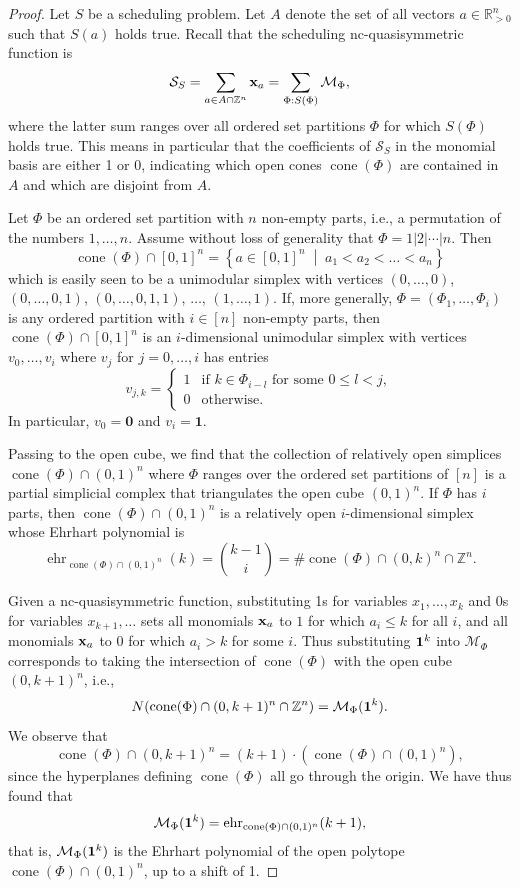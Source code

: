 \documentclass[12pt,reqno]{amsart}
\numberwithin{definition}{section}
\theoremstyle{definition}
\newcommand{\RR}{\mathbb{R}}
\newcommand{\ZZ}{\mathbb{Z}}
\newcommand{\SSS}{\mathcal{S}}
\newcommand{\ehr}{\operatorname{ehr}}
\newcommand{\cone}{\operatorname{cone}}
\newcommand{\choice}[1]{\left\{ \begin{array}{ll} #1 \end{array} \right.}
\newcommand{\mset}[2]{ \left\{ #1 \; \middle| \; #2 \right\}}
\newcommand{\ncM}{\mathcal{M}}
\newcommand{\poly}{\chi} %
\begin{document}
\begin{proof}
Let $S$ be a scheduling problem. Let $A$ denote the set of all vectors $a\in\RR^n_{> 0}$ such that $S(a)$ holds true. Recall that the scheduling nc-quasisymmetric function is
\[
 \SSS_S = \sum_{a\in A\cap\ZZ^n} {\bf{x}}_a = \sum_{\Phi:S(\Phi)} \ncM_\Phi,
\]
where the latter sum ranges over all ordered set partitions $\Phi$ for which $S(\Phi)$ holds true. This means in particular that the coefficients of $\SSS_S$ in the monomial basis are either 1 or 0, indicating which open cones $\cone(\Phi)$ are contained in $A$ and which are disjoint from $A$.

Let $\Phi$ be an ordered set partition with $n$ non-empty parts, i.e., a permutation of the numbers $1,\ldots,n$. Assume without loss of generality that $\Phi=1|2|\cdots|n$. Then
\[
  \cone(\Phi)\cap [0,1]^n = \mset{a\in[0,1]^n}{a_1<a_2<\ldots<a_n}
\]
which is easily seen to be a unimodular simplex with vertices $(0,\ldots,0)$, $(0,\ldots,0,1)$, $(0,\ldots,0,1,1)$, $\ldots$, $(1,\ldots,1)$. If, more generally, $\Phi=(\Phi_1,\ldots,\Phi_i)$ is any ordered partition with $i\in[n]$ non-empty parts, then $\cone(\Phi)\cap[0,1]^n$ is an $i$-dimensional unimodular simplex with vertices $v_0,\ldots,v_i$ where $v_j$ for $j=0,\ldots,i$ has entries 
\[
 v_{j,k} = \choice{1 & \text{if }k\in\Phi_{i-l} \text{ for some } 0\leq l < j, \\ 0 & \text{otherwise.} }
\]
In particular, $v_0= \mathbf{0}$ and $v_i=\mathbf{1}$. 

Passing to the open cube, we find that the collection of relatively open simplices $\cone(\Phi)\cap (0,1)^n$ where $\Phi$ ranges over the ordered set partitions of $[n]$ is a partial simplicial complex that triangulates the open cube $(0,1)^n$. If $\Phi$ has $i$ parts, then $\cone(\Phi)\cap (0,1)^n$ is a relatively open $i$-dimensional simplex whose Ehrhart polynomial is
\[
  \ehr_{\cone(\Phi)\cap (0,1)^n}(k) = \binom{k-1}{i} = \#\cone(\Phi)\cap (0,k)^n \cap \ZZ^n.
\] 


Given a nc-quasisymmetric function, substituting 1s for variables $x_1,\ldots,x_k$ and $0$s for variables $x_{k+1},\ldots$  sets all monomials ${\bf x}_a$ to $1$ for which $a_i \leq k$ for all $i$, and all monomials ${\bf x}_a$ to $0$ for which $a_i > k$ for some $i$. Thus substituting ${\bf 1}^k$ into $\ncM_\Phi$ corresponds to taking the intersection of $\cone(\Phi)$ with the open cube $(0,k+1)^n$, i.e.,
\[
 N(\cone(\Phi)\cap(0,k+1)^n\cap\ZZ^n) = \ncM_\Phi({\bf 1}^k).
\]
We observe that
\[
  \cone(\Phi)\cap(0,k+1)^n = (k+1)\cdot (\cone(\Phi)\cap(0,1)^n), 
\]
since the hyperplanes defining $\cone(\Phi)$ all go through the origin. We have thus found that
\begin{eqnarray}
\label{eqn:spec ncM}
  \ncM_\Phi({\bf 1}^k) 
= \ehr_{\cone(\Phi)\cap(0,1)^n}(k+1),
\end{eqnarray}
that is, $\ncM_\Phi({\bf 1}^k)$ is the Ehrhart polynomial of the open polytope $\cone(\Phi)\cap(0,1)^n$, up to a shift of 1. 






\end{proof}
\end{document}
